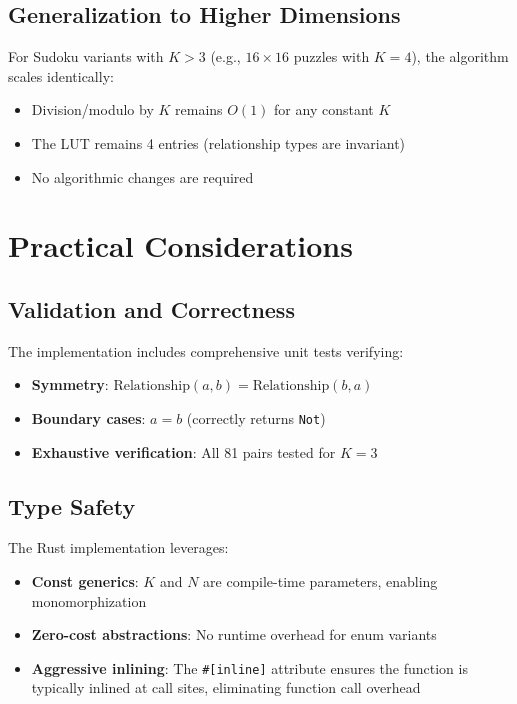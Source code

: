 \documentclass[11pt,a4paper]{article}
\begin{document}
\subsection{Generalization to Higher Dimensions}

For Sudoku variants with $K > 3$ (e.g., $16 \times 16$ puzzles with $K = 4$), the algorithm scales identically:
\begin{itemize}
    \item Division/modulo by $K$ remains $O(1)$ for any constant $K$
    \item The LUT remains 4 entries (relationship types are invariant)
    \item No algorithmic changes are required
\end{itemize}

\section{Practical Considerations}

\subsection{Validation and Correctness}

The implementation includes comprehensive unit tests verifying:
\begin{itemize}
    \item \textbf{Symmetry}: $\text{Relationship}(a, b) = \text{Relationship}(b, a)$
    \item \textbf{Boundary cases}: $a = b$ (correctly returns \texttt{Not})
    \item \textbf{Exhaustive verification}: All 81 pairs tested for $K = 3$
\end{itemize}

\subsection{Type Safety}

The Rust implementation leverages:
\begin{itemize}
    \item \textbf{Const generics}: $K$ and $N$ are compile-time parameters, enabling monomorphization
    \item \textbf{Zero-cost abstractions}: No runtime overhead for enum variants
    \item \textbf{Aggressive inlining}: The \texttt{\#[inline]} attribute ensures the function is typically inlined at call sites, eliminating function call overhead
\end{itemize}
\end{document}
